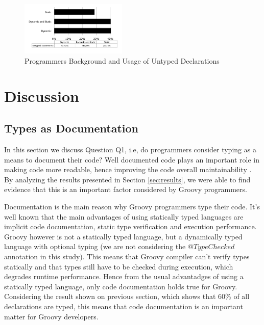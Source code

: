\documentclass[preprint]{sigplanconf}
\begin{document}
\begin{figure}[ht]
\centering \includegraphics[width=0.45\textwidth]{images/untyped_background} 
\caption{Programmers Background and Usage of Untyped Declarations}
\label{fig:untyped_background} 
\end{figure}


















%
%
\section{Discussion\label{sec:Discussion}}


\subsection{Types as Documentation}
In this section we discuss Question Q1, i.e, do programmers consider typing as a means to document their code?
Well documented code plays an important role in making code more readable, hence improving the code overall maintainability \cite{Iso2004}.
By analyzing the results presented in Section \ref{sec:results}, we were able to find evidence that this is an important factor considered by Groovy programmers.

Documentation is the main reason why Groovy programmers type their code.
It's well known that the main advantages of using statically typed languages are implicit code documentation, static type verification and execution performance.
Groovy however is not a statically typed language, but a dynamically typed language with optional typing (we are not considering the $@TypeChecked$ annotation in this study).
This means that Groovy compiler can't verify types statically and that types still have to be checked during execution, which degrades runtime performance.
Hence from the usual advantadges of using a statically typed language, only code documentation holds true for Groovy.
Considering the result shown on previous section, which shows that 60\% of all declarations are typed, this means that code documentation is an important matter for Groovy developers.
\end{document}
